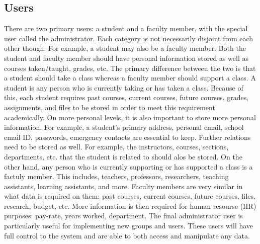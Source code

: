 \documentclass{article}
\begin{document}
  \subsection{Users}\label{sec:Requirements:Users}
    There are two primary users: a student and a faculty member, with the special user called the administrator.  Each category is not necessarily disjoint from each other though.  For example,  a student may also be a faculty member.  Both the student and faculty member should have personal information stored as well as courses taken/taught, grades, etc.  The primary difference between the two is that a student should take a class whereas a faculty member should support a class.
    \newline\newline
    A student is any person who is currently taking or has taken a class.  Because of this, each student requires past courses, current courses, future courses, grades, assignments, and files to be stored in order to meet this requirement academically.  On more personal levels, it is also important to store more personal information.  For example, a student's primary address, personal email, school email ID, passwords, emergency contacts are essential to keep.  Further relations need to be stored as well.  For example, the instructors, courses, sections, departments, etc. that the student is related to should alos be stored.
    \newline\newline
    On the other hand, any person who is currently supporting or has supported a class is a factuly member.  This includes, teachers, professors, researchers, teaching assistants, learning assistants, and more.  Faculty members are very similar in what data is required on them: past courses, current courses, future courses, files, research, budget, etc.  More information is then required for human resourse (HR) purposes: pay-rate, years worked, department.
    \newline\newline
    The final administrator user is particularly useful for implementing new groups and users.  These users will have full control to the system and are able to both access and manipulate any data.
\end{document}
